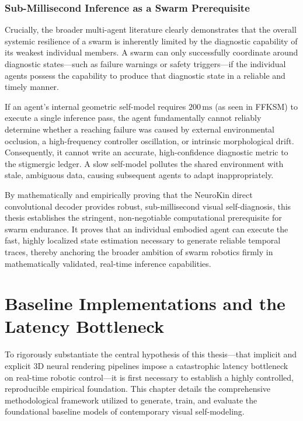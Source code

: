 \documentclass[12pt,a4paper,oneside]{report}
\begin{document}
\subsection{Sub-Millisecond Inference as a Swarm Prerequisite}

Crucially, the broader multi-agent literature clearly demonstrates that the overall systemic resilience of a swarm is inherently limited by the diagnostic capability of its weakest individual members. A swarm can only successfully coordinate around diagnostic states—such as failure warnings or safety triggers—if the individual agents possess the capability to produce that diagnostic state in a reliable and timely manner. 

If an agent's internal geometric self-model requires $200\,\mathrm{ms}$ (as seen in FFKSM) to execute a single inference pass, the agent fundamentally cannot reliably determine whether a reaching failure was caused by external environmental occlusion, a high-frequency controller oscillation, or intrinsic morphological drift. Consequently, it cannot write an accurate, high-confidence diagnostic metric to the stigmergic ledger. A slow self-model pollutes the shared environment with stale, ambiguous data, causing subsequent agents to adapt inappropriately.

By mathematically and empirically proving that the NeuroKin direct convolutional decoder provides robust, sub-millisecond visual self-diagnosis, this thesis establishes the stringent, non-negotiable computational prerequisite for swarm endurance. It proves that an individual embodied agent can execute the fast, highly localized state estimation necessary to generate reliable temporal traces, thereby anchoring the broader ambition of swarm robotics firmly in mathematically validated, real-time inference capabilities.

\chapter{Baseline Implementations and the Latency Bottleneck}

To rigorously substantiate the central hypothesis of this thesis—that implicit and explicit 3D neural rendering pipelines impose a catastrophic latency bottleneck on real-time robotic control—it is first necessary to establish a highly controlled, reproducible empirical foundation. This chapter details the comprehensive methodological framework utilized to generate, train, and evaluate the foundational baseline models of contemporary visual self-modeling. 
\end{document}
